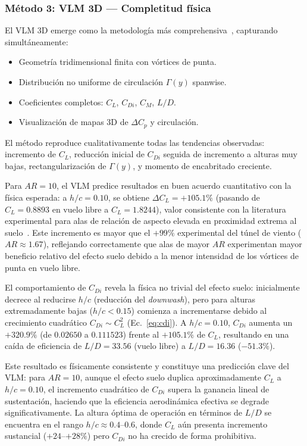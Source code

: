 \documentclass[twocolumn]{article}
\begin{document}
\subsubsection{Método 3: VLM 3D --- Completitud física}

El VLM 3D emerge como la metodología más comprehensiva~\cite{katz2001}, capturando simultáneamente:

\begin{itemize}
\item Geometría tridimensional finita con vórtices de punta.
\item Distribución no uniforme de circulación $\Gamma(y)$ spanwise.
\item Coeficientes completos: $C_L$, $C_{Di}$, $C_M$, $L/D$.
\item Visualización de mapas 3D de $\Delta C_p$ y circulación.
\end{itemize}

El método reproduce cualitativamente todas las tendencias observadas: incremento de $C_L$, reducción inicial de $C_{Di}$ seguida de incremento a alturas muy bajas, rectangularización de $\Gamma(y)$, y momento de encabritado creciente.

Para $\mathit{AR} = 10$, el VLM predice resultados en buen acuerdo cuantitativo con la física esperada: a $h/c = 0.10$, se obtiene $\Delta C_L = +105.1\%$ (pasando de $C_L = 0.8893$ en vuelo libre a $C_L = 1.8244$), valor consistente con la literatura experimental para alas de relación de aspecto elevada en proximidad extrema al suelo~\cite{zerihan2000}. Este incremento es mayor que el $+99\%$ experimental del túnel de viento ($\mathit{AR} \approx 1.67$), reflejando correctamente que alas de mayor $\mathit{AR}$ experimentan mayor beneficio relativo del efecto suelo debido a la menor intensidad de los vórtices de punta en vuelo libre.

El comportamiento de $C_{Di}$ revela la física no trivial del efecto suelo: inicialmente decrece al reducirse $h/c$ (reducción del \textit{downwash}), pero para alturas extremadamente bajas ($h/c < 0.15$) comienza a incrementarse debido al crecimiento cuadrático $C_{Di} \sim C_L^2$ (Ec.~\eqref{eq:cdi}). A $h/c = 0.10$, $C_{Di}$ aumenta un $+320.9\%$ (de $0.02650$ a $0.111523$) frente al $+105.1\%$ de $C_L$, resultando en una caída de eficiencia de $L/D = 33.56$ (vuelo libre) a $L/D = 16.36$ ($-51.3\%$). 

Este resultado es físicamente consistente y constituye una predicción clave del VLM: para $\mathit{AR} = 10$, aunque el efecto suelo duplica aproximadamente $C_L$ a $h/c = 0.10$, el incremento cuadrático de $C_{Di}$ supera la ganancia lineal de sustentación, haciendo que la eficiencia aerodinámica efectiva se degrade significativamente. La altura óptima de operación en términos de $L/D$ se encuentra en el rango $h/c \approx 0.4$--$0.6$, donde $C_L$ aún presenta incremento sustancial ($+24$--$+28\%$) pero $C_{Di}$ no ha crecido de forma prohibitiva.
\end{document}
